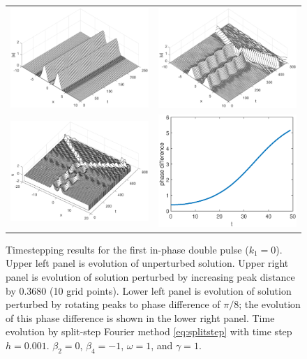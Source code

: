 \documentclass[12pt]{elsarticle}
\begin{document}
\begin{figure}[H]
\centering
\begin{tabular}{cc}
\includegraphics[width=8cm]{images/DP0ppwaterfall} &
\includegraphics[width=8cm]{images/DP0ppstretchwaterfall} \\
\includegraphics[width=8cm]{images/DP0ppphasewaterfall} &
\includegraphics[width=6cm]{images/DP0ppphasedifference}
\end{tabular}
\caption{Timestepping results for the first in-phase double pulse ($k_1 = 0$). Upper left panel is evolution of unperturbed solution. Upper right panel is evolution of solution perturbed by increasing peak distance by $0.3680$ (10 grid points). Lower left panel is evolution of solution perturbed by rotating peaks to phase difference of $\pi/8$; the evolution of this phase difference is shown in the lower right panel. Time evolution by split-step Fourier method \cref{eq:splitstep} with time step $h = 0.001$. $\beta_2 = 0$, $\beta_4 = -1$, $\omega = 1$, and $\gamma = 1$.}
\label{fig:timestep0pp}
\end{figure}
\end{document}
